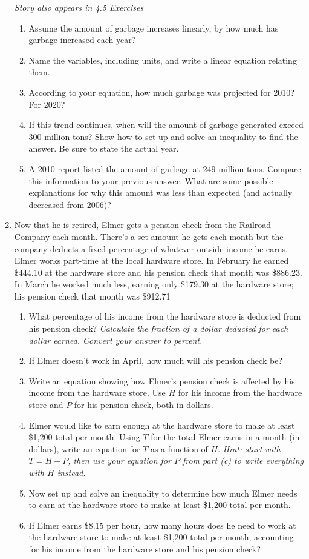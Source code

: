\begin{enumerate}
\hfill \emph{Story also appears in 4.5 Exercises}
\begin{enumerate}
\item Assume the amount of garbage increases linearly, by how much has garbage increased each year? 
\item Name the variables, including units, and write a linear equation relating them.
\item According to your equation, how much garbage was projected for 2010?  For 2020?
\item If this trend continues, when will the amount of garbage generated exceed 300 million tons?   Show how to set up and solve an inequality to find the answer.  Be sure to state the actual year.
\item A 2010 report listed the amount of garbage at 249 million tons.  Compare this information to your previous answer.  What are some possible explanations for why this amount was less than expected (and actually decreased from 2006)?
\end{enumerate} 

\item Now that he is retired, Elmer gets a pension check from the Railroad Company each month.  There's a set amount he gets each month but the company deducts a fixed percentage of whatever outside income he earns.  Elmer works part-time at the local hardware store.  In February he earned \$444.10 at the hardware store and his pension check that month was \$886.23.  In March he worked much less,  earning only \$179.30 at the hardware store; his pension check that month was \$912.71
\begin{enumerate}
\item What percentage of his income from the hardware store is deducted from his pension check?  \emph{Calculate the fraction of a dollar deducted for each dollar earned.  Convert your answer to percent.}
\item If Elmer doesn't work in April, how much will his pension check be?  
\item Write an equation showing how Elmer's pension check is affected by his income from the hardware store.  Use $H$ for his income from the hardware store and $P$ for his pension check, both in dollars.  
\item Elmer would like to earn enough at the hardware store to make at least \$1,200 total per month.  Using $T$ for the total Elmer earns in a month (in dollars), write an equation for $T$ as a function of $H$.  \emph{Hint:  start with $T=H+P$, then use your equation for $P$ from part (c) to write everything with $H$ instead.}
\item Now set up and solve an inequality to determine how much Elmer needs to earn at the hardware store to make at least \$1,200 total per month.
\item If Elmer earns \$8.15 per hour, how many hours does he need to work at the hardware store to make at least  \$1,200 total per month, accounting for his income from the hardware store and his pension check?
\end{enumerate}
 

\end{enumerate}
